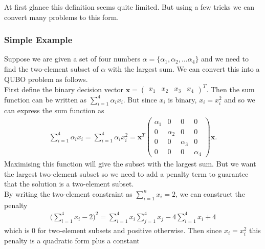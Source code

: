 \documentclass{article}
\begin{document}
\noindent At first glance this definition seems quite limited. But using a few tricks we can convert many problems to this form.

\subsubsection{Simple Example}
\noindent Suppose we are given a set of four numbers \(\alpha = \{\alpha_1,\alpha_2, \dots \alpha_4\}\) and we need to find the two-element subset of \(\alpha\) with the largest sum. We can convert this into a QUBO problem as follows. \\

\noindent First define the binary decision vector \(\mathbf{x} = \begin{pmatrix}
	x_1 & x_2 & x_3 & x_4
	\end{pmatrix}^T\). 
Then the sum function can be written as \(\sum_{i=1}^4 \alpha_i x_i\). But since \(x_i\) is binary, \(x_i = x_i^2\) and so we can express the sum function as
\begin{align*}
\sum_{i=1}^4 \alpha_i x_i = \sum_{i=1}^4 \alpha_i x_i^2 = \mathbf{x}^T\begin{pmatrix}
	\alpha_1 & 0 & 0 & 0 \\
	0 & \alpha_2 & 0 & 0 \\
	0 & 0 & \alpha_3 & 0 \\ 
	0 & 0 & 0 & \alpha_4
\end{pmatrix}\mathbf{x}.
\end{align*} 
\noindent Maximising this function will give the subset with the largest sum. But we want the largest two-element subset so we need to add a penalty term to guarantee that the solution is a two-element subset. \\
By writing the two-element constraint as \(\sum_{i=1}^n x_i = 2\), we can construct the penalty 
\begin{align*}
    \bigg(\sum_{i=1}^4 x_i - 2\bigg)^2 = \sum_{i=1}^4 x_i\sum_{j=1}^4 x_j - 4\sum_{i=1}^4 x_i + 4
\end{align*}
\noindent which is 0 for two-element subsets and positive otherwise. Then since \(x_i = x_i^2\) this penalty is a quadratic form plus a constant
\end{document}
